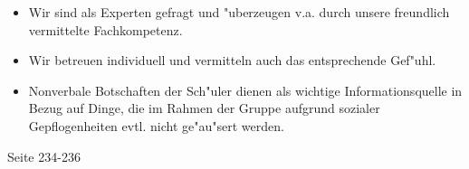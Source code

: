 \begin{solution}
\begin{itemize}
\item Wir sind als Experten gefragt und "uberzeugen v.a. durch unsere freundlich vermittelte
Fachkompetenz.
\item Wir betreuen individuell und vermitteln auch das entsprechende Gef"uhl.
\item Nonverbale Botschaften der Sch"uler dienen als wichtige Informationsquelle in Bezug auf Dinge, die im Rahmen der Gruppe aufgrund sozialer Gepflogenheiten evtl. nicht ge"au"sert werden.
\end{itemize}
 Seite 234-236
\end{solution}
